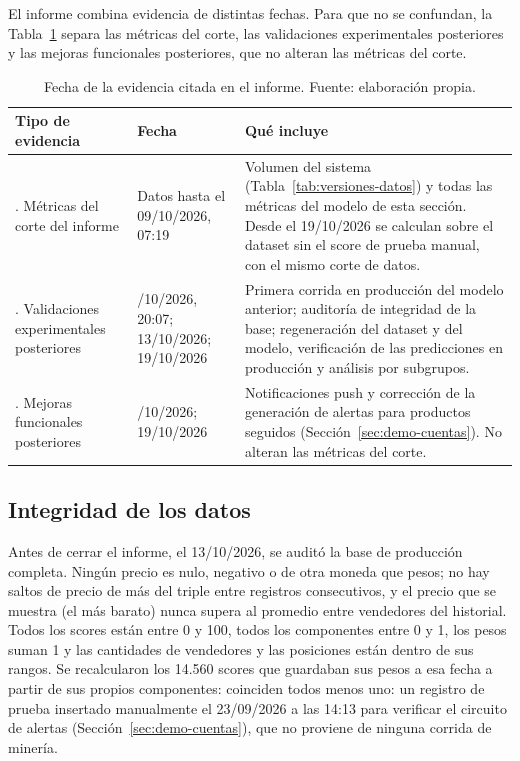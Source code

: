 El informe combina evidencia de distintas fechas. Para que no se confundan, la Tabla~\ref{tab:fechas-evidencia} separa las métricas del corte, las validaciones experimentales posteriores y las mejoras funcionales posteriores, que no alteran las métricas del corte.

\begin{table}[H]
	\centering
	\small
	\caption{Fecha de la evidencia citada en el informe. Fuente: elaboración propia.}
	\label{tab:fechas-evidencia}
	\begin{tabularx}{\textwidth}{@{}>{\raggedright\arraybackslash}p{3.3cm} >{\raggedright\arraybackslash}p{2.6cm} X@{}}
		\toprule
		\textbf{Tipo de evidencia} & \textbf{Fecha} & \textbf{Qué incluye} \\
		\midrule
		1. Métricas del corte del informe & Datos hasta el 09/10/2026, 07:19 & Volumen del sistema (Tabla~\ref{tab:versiones-datos}) y todas las métricas del modelo de esta sección. Desde el 19/10/2026 se calculan sobre el dataset sin el score de prueba manual, con el mismo corte de datos. \\
		2. Validaciones experimentales posteriores & 09/10/2026, 20:07; 13/10/2026; 19/10/2026 & Primera corrida en producción del modelo anterior; auditoría de integridad de la base; regeneración del dataset y del modelo, verificación de las predicciones en producción y análisis por subgrupos. \\
		3. Mejoras funcionales posteriores & 12/10/2026; 19/10/2026 & Notificaciones push y corrección de la generación de alertas para productos seguidos (Sección~\ref{sec:demo-cuentas}). No alteran las métricas del corte. \\
		\bottomrule
	\end{tabularx}
\end{table}

\subsection*{Integridad de los datos}\label{sec:integridad-datos}

Antes de cerrar el informe, el 13/10/2026, se auditó la base de producción completa. Ningún precio es nulo, negativo o de otra moneda que pesos; no hay saltos de precio de más del triple entre registros consecutivos, y el precio que se muestra (el más barato) nunca supera al promedio entre vendedores del historial. Todos los scores están entre 0 y 100, todos los componentes entre 0 y 1, los pesos suman 1 y las cantidades de vendedores y las posiciones están dentro de sus rangos. Se recalcularon los 14.560 scores que guardaban sus pesos a esa fecha a partir de sus propios componentes: coinciden todos menos uno: un registro de prueba insertado manualmente el 23/09/2026 a las 14:13 para verificar el circuito de alertas (Sección~\ref{sec:demo-cuentas}), que no proviene de ninguna corrida de minería.

